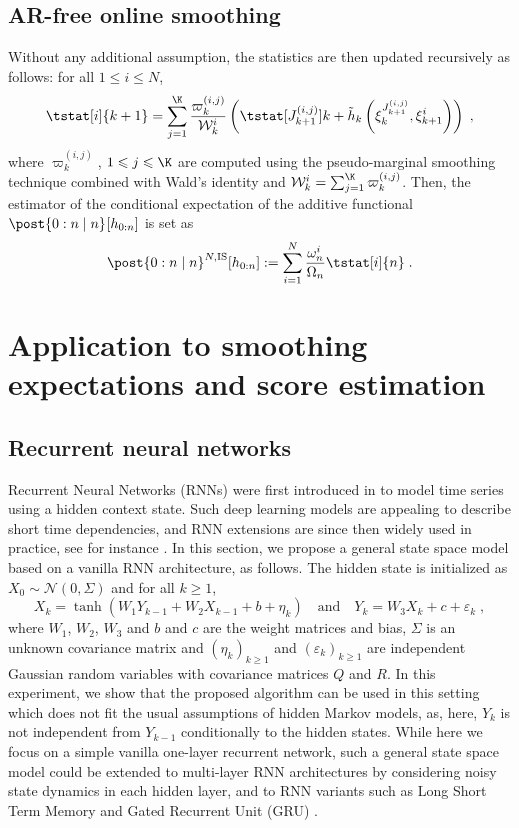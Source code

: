 \documentclass[12pt]{article}
\newcommand{\af}[1]{h_{#1}}
\newcommand{\addf}[1]{\termletter_{#1}}
\newcommand{\termletter}{\tilde{h}}
\newcommand{\N}{N}
\newcommand{\bi}[3]{J_{#1}^{(#2, #3)}}
\newcommand{\eqdef}{\ensuremath{:=}}
\newcommand{\eqsp}{\;}
\newcommand{\ewght}[2]{\ensuremath{\omega_{#1}^{#2}}}
\newcommand{\epart}[2]{\ensuremath{\xi_{#1}^{#2}}}
\newcommand{\sumwght}[2][]{%
\ifthenelse{\equal{#1}{}}{\ensuremath{\Omega_{#2}}}{\ensuremath{\Omega_{#2}^{(#1)}}}}
\begin{document}
\subsection{AR-free online smoothing}
Without any additional assumption, the statistics are then updated recursively as follows: for all $1\leqslant i\leqslant \N$,
\begin{equation}
\label{eq:update:paris:marginal:is}
\tstat[i]{k+1} =\sum_{j=1}^{\K}\frac{\varpi_k^{(i,j)}}{\mathcal{W}_k^i}\left( \tstat[\bi{k+1}{i}{j}]{k} + \addf{k}\left(\epart{k}{\bi{k+1}{i}{j}}, \epart{k+1}{i}\right)\right)\eqsp,
\end{equation}
where $\varpi_k^{(i,j)}$, $1\leqslant j \leqslant \K$ are computed using the pseudo-marginal smoothing technique combined with Wald's identity and $\mathcal{W}_k^i = \sum_{j=1}^{\K} \varpi_k^{(i,j)}$. 
Then, the estimator of the conditional expectation of the additive functional $\post{0:n\mid n}^{} [\af{0:n}]$ is set as
\[
\post{0:n\mid n}^{\N,\textrm{IS}} [\af{0:n}] \eqdef \sum_{i=1}^{\N}\frac{\ewght{n}{i}}{\sumwght{n}}\tstat[i]{n}\eqsp.
\]

\section{Application to smoothing expectations and score estimation}
\label{sec:application}

\subsection{Recurrent neural networks}
\label{sec:simu:RNN}


Recurrent Neural Networks (RNNs) were first introduced in \cite{Mozer1989AFB} to model time series using a hidden context state. Such deep learning models are appealing to describe short time dependencies, and RNN extensions \citep{Hochreiter1997LongSM, Cho2014LearningPR} are since then widely used in practice, see for instance \cite{mikolov2010recurrent, sutskever2011generating, sutskever2014sequence}.
 In this section, we propose a general state space model based on a vanilla RNN architecture, as follows.  
 The hidden state is initialized as $X_0 \sim \mathcal{N}(0,\Sigma)$ and for all $k\geqslant 1$,
$$
X_k = \tanh(W_{1} Y_{k-1} + W_{2} X_{k-1} + b + \eta_k)\quad\mathrm{and} \quad Y_k = W_{3} X_{k}  + c + \varepsilon_k\eqsp,
$$
where $W_{1}$, $W_{2}$, $W_3$ and $b$ and $c$ are the weight matrices and bias,  $\Sigma$ is an unknown covariance matrix and $(\eta_k)_{k\geqslant 1}$ and $(\varepsilon_k)_{k\geqslant 1}$ are independent Gaussian random variables with covariance matrices $Q$ and $R$.
In this experiment,  we show that the proposed algorithm can be used in this setting which does not fit the usual assumptions of hidden Markov models, as, here, $Y_k$ is not independent from $Y_{k - 1}$ conditionally to the hidden states. 
While here we focus on a simple vanilla one-layer recurrent network, such a general state space model could be extended to multi-layer RNN architectures by considering noisy state dynamics in each hidden layer, and to RNN variants such as Long Short Term Memory  \citep{Hochreiter1997LongSM} and Gated Recurrent Unit (GRU) \citep{Cho2014LearningPR}.
 
\end{document}
